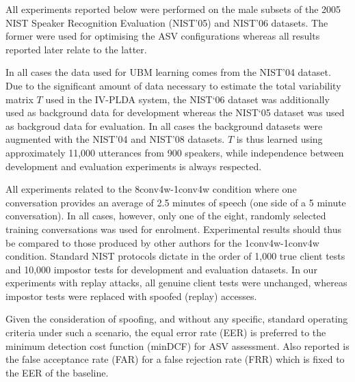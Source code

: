 
All experiments reported below were performed on the male subsets of the 2005 NIST Speaker Recognition Evaluation (NIST'05) and NIST'06 datasets.  
The former were used for optimising the ASV configurations whereas all results reported later relate to the latter.

In all cases the data used for UBM learning comes from the NIST'04 dataset.  Due to the significant amount of data necessary to estimate the total variability matrix $T$ used in the IV-PLDA system, the NIST`06 dataset was additionally used as background data for development whereas the NIST`05 dataset was used as backgroud data for evaluation. 
In all cases the background datasets were augmented with the NIST'04 and NIST'08 datasets.  $T$ is thus learned using approximately 11,000 utterances from 900 speakers, while independence between development and evaluation experiments is always respected.

All experiments related to the 8conv4w-1conv4w condition where one conversation provides an average of 2.5 minutes of speech (one side of a 5 minute conversation).  In all cases, however, only one of the eight, randomly selected training conversations was used for enrolment.  Experimental results should thus be compared to those produced by other authors for the 1conv4w-1conv4w condition. Standard NIST protocols dictate in the order of 1,000 true client tests and 10,000 impostor tests for development and evaluation datasets. In our experiments with replay attacks, all genuine client tests were unchanged, whereas impostor tests were replaced with spoofed (replay) accesses. 

Given the consideration of spoofing, and without any specific, standard operating criteria under such a scenario, the equal error rate (EER) is preferred to the minimum detection cost function (minDCF) for ASV assessment.  Also reported is the false acceptance rate (FAR) for a false rejection rate (FRR) which is fixed to the EER of the baseline.  

